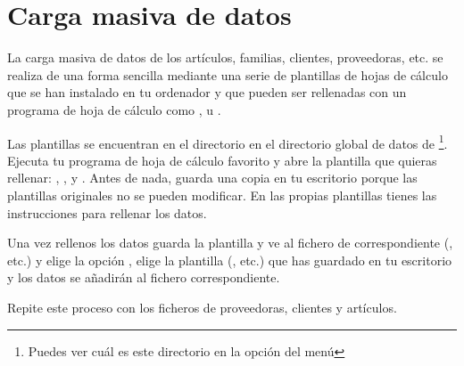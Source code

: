\chapter{Carga masiva de datos}

La carga masiva de datos de los artículos, familias, clientes, proveedoras, etc. se realiza de una forma sencilla mediante  una serie de plantillas de hojas de cálculo que se han instalado en tu ordenador y que pueden ser rellenadas con un programa de hoja de cálculo como ,  u .

Las plantillas se encuentran en el directorio  en el directorio global de datos de \appname\footnote{Puedes ver cuál es este directorio en la opción del menú }. Ejecuta tu programa de hoja de cálculo favorito y abre la plantilla que quieras rellenar: , ,  y . Antes de nada, guarda una copia en tu escritorio porque las plantillas originales no se pueden modificar. En las propias plantillas tienes las instrucciones para rellenar los datos. 


Una vez rellenos los datos guarda la plantilla y ve al fichero de correspondiente (, etc.) y elige la opción , elige la plantilla (, etc.) que has guardado en tu escritorio y los datos se añadirán al fichero correspondiente. 

Repite este proceso con los ficheros de proveedoras, clientes y artículos.

